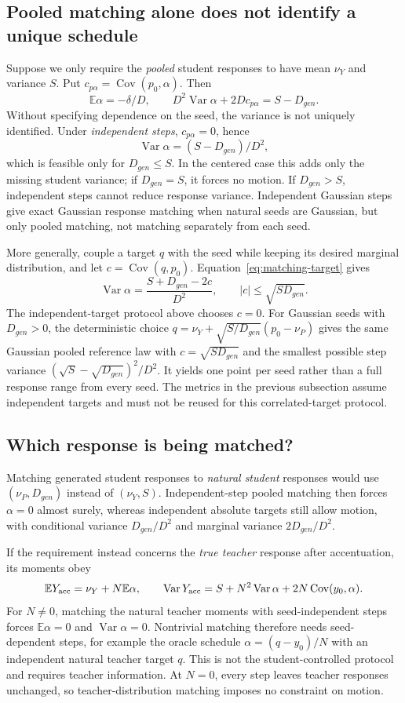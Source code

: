 \documentclass[11pt]{article}
\newcommand{\E}{\mathbb E}
\newcommand{\Var}{\operatorname{Var}}
\newcommand{\Cov}{\operatorname{Cov}}
\begin{document}
\subsection{Pooled matching alone does not identify a unique schedule}
Suppose we only require the \emph{pooled} student responses to have mean
$\nu_Y$ and variance $S$. Put $c_{p\alpha}=\Cov(p_0,\alpha)$. Then
\begin{equation}
 \E\alpha=-\delta/D,\qquad
 D^2\Var\alpha+2D c_{p\alpha}=S-D_{gen}.
 \label{eq:pooled-matching-constraint}
\end{equation}
Without specifying dependence on the seed, the variance is not uniquely
identified. Under \emph{independent steps}, $c_{p\alpha}=0$, hence
\[
 \Var\alpha=(S-D_{gen})/D^2,
\]
which is feasible only for $D_{gen}\leq S$. In the centered case this adds only the
missing student variance; if $D_{gen}=S$, it forces no motion. If $D_{gen}>S$, independent
steps cannot reduce response variance. Independent Gaussian steps give exact
Gaussian response matching when natural seeds are Gaussian, but only pooled
matching, not matching separately from each seed.

More generally, couple a target $q$ with the seed while keeping its desired
marginal distribution, and let $c=\Cov(q,p_0)$. Equation~\eqref{eq:matching-target}
gives
\[
 \Var\alpha=\frac{S+D_{gen}-2c}{D^2},\qquad |c|\leq\sqrt{S D_{gen}}.
\]
The independent-target protocol above chooses $c=0$. For Gaussian seeds with
$D_{gen}>0$, the deterministic choice
$q=\nu_Y+\sqrt{S/D_{gen}}(p_0-\nu_P)$ gives the same Gaussian pooled reference law
with $c=\sqrt{S D_{gen}}$ and the smallest possible step variance
$(\sqrt S-\sqrt{D_{gen}})^2/D^2$. It yields one point per seed rather than a full
response range from every seed. The metrics in the previous subsection assume
independent targets and must not be reused for this correlated-target protocol.

\subsection{Which response is being matched?}
Matching generated student responses to \emph{natural student} responses
would use $(\nu_P,D_{gen})$ instead of $(\nu_Y,S)$. Independent-step pooled matching
then forces $\alpha=0$ almost surely, whereas independent absolute targets
still allow motion, with conditional variance $D_{gen}/D^2$ and marginal variance
$2D_{gen}/D^2$.

If the requirement instead concerns the \emph{true teacher} response after
accentuation, its moments obey
\[
 \E Y_{\rm acc}=\nu_Y+N\E\alpha,\qquad
 \Var Y_{\rm acc}=S+N^2\Var\alpha+2N\Cov(y_0,\alpha).
\]
For $N\ne0$, matching the natural teacher moments with seed-independent steps
forces $\E\alpha=0$ and $\Var\alpha=0$. Nontrivial matching therefore needs
seed-dependent steps, for example the oracle schedule
$\alpha=(q-y_0)/N$ with an independent natural teacher target $q$.
This is not the student-controlled protocol and requires teacher information.
At $N=0$, every step leaves teacher responses unchanged, so teacher-distribution
matching imposes no constraint on motion.
\end{document}
